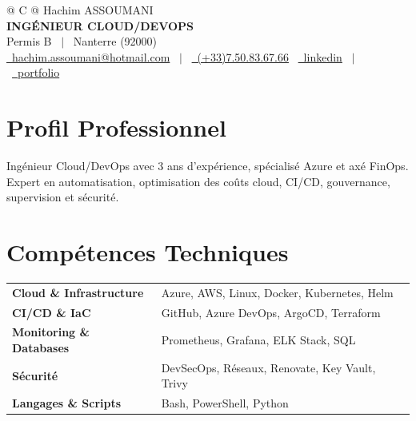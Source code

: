\documentclass[a4paper,10pt]{article}
\begin{document}
\pagestyle{empty} 


\begin{tabularx}{\linewidth}{@{} C @{}}
\Large{Hachim ASSOUMANI} \\[2pt]
\textbf{\normalsize{INGÉNIEUR CLOUD/DEVOPS}} \\[1pt]
Permis B \ $|$ \ Nanterre (92000) \\[1pt]
\href{mailto:hachim.assoumani@hotmail.com}{\raisebox{-0.05\height}\faEnvelope \ hachim.assoumani@hotmail.com} \ $|$ \ 
\href{tel:+33750836766}{\raisebox{-0.05\height}\faMobile \ (+33)7.50.83.67.66} \
\href{https://www.linkedin.com/in/hachim-assoumani-957168293/}{\raisebox{-0.05\height}\faLinkedin \ linkedin} \ $|$ \
\href{https://hachimmm.github.io/portfolio-hachim/}{\raisebox{-0.05\height}\faGlobe \ portfolio} \
\end{tabularx}

\vspace{3pt}


\section{Profil Professionnel}
Ingénieur Cloud/DevOps avec 3 ans d'expérience, spécialisé Azure et axé FinOps. Expert en automatisation, optimisation des coûts cloud, CI/CD, gouvernance, supervision et sécurité.

\vspace{3pt}

\section{Compétences Techniques}
\begin{tabularx}{\linewidth}{@{}l X@{}}
\textbf{Cloud \& Infrastructure} & Azure, AWS, Linux, Docker, Kubernetes, Helm\\
\textbf{CI/CD \& IaC} & GitHub, Azure DevOps, ArgoCD, Terraform\\
\textbf{Monitoring \& Databases} & Prometheus, Grafana, ELK Stack, SQL\\
\textbf{Sécurité} & DevSecOps, Réseaux, Renovate, Key Vault, Trivy\\
\textbf{Langages \& Scripts} & Bash, PowerShell, Python\\
\end{tabularx}
\end{document}
